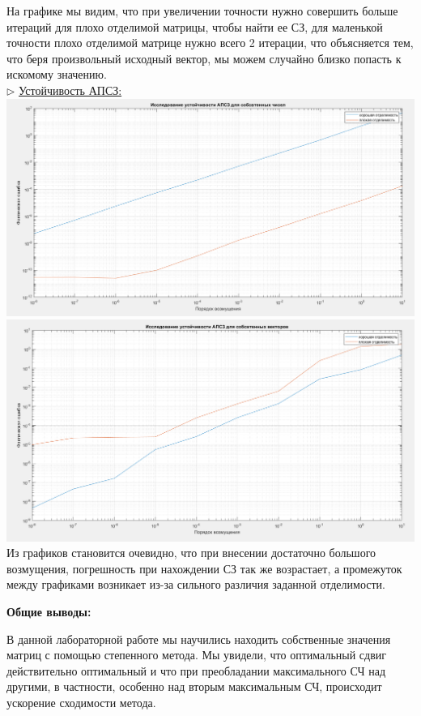 \documentclass{article}
\begin{document}
	На графике мы видим, что при увеличении точности нужно совершить больше итераций для плохо отделимой матрицы, чтобы найти ее СЗ, для маленькой точности плохо отделимой матрице нужно всего 2 итерации, что объясняется тем, что беря произвольный исходный вектор, мы можем случайно близко попасть к искомому значению.\\
	$\triangleright$ \underline{Устойчивость АПСЗ:}\\
	\includegraphics[scale = 0.255]{АПСЗ СЧ}
	\includegraphics[scale = 0.25]{АПСЗ СВ}\\
	Из графиков становится очевидно, что при внесении достаточно большого возмущения, погрешность при нахождении СЗ так же возрастает, а промежуток между графиками возникает из-за сильного различия заданной отделимости.
	\begin{center} \textbf{Общие выводы:}\end{center}
	В данной лабораторной работе мы научились находить собственные значения матриц с помощью степенного метода. Мы увидели, что оптимальный сдвиг действительно оптимальный и что при преобладании максимального СЧ над другими, в частности, особенно над вторым максимальным СЧ, происходит ускорение сходимости метода.
\end{document}
